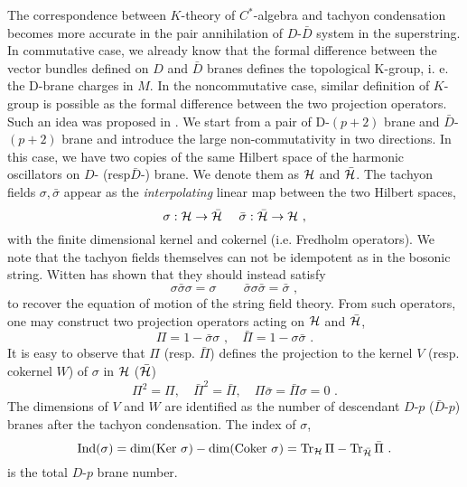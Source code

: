 \documentclass[a4paper,12pt]{article}
\begin{document}
The correspondence between $K$-theory of
$C^*$-algebra and tachyon condensation becomes more accurate
in the pair annihilation of $D$-$\bar{D}$ 
system in the superstring.
In commutative case, we already know
\cite{r:Witten2} that the formal difference between the 
vector bundles defined on $D$ and $\bar{D}$ branes defines
the topological K-group, i. e. the D-brane charges in $M$.
In the noncommutative case, similar definition of
$K$-group is possible as the formal difference
between the  two projection operators.
Such an idea was proposed in \cite{r:Witten}.
We start from  a pair of D-$(p+2)$ brane and
$\bar D$-$(p+2)$ brane and introduce the large
non-commutativity in two directions.
In this case, we have two copies of
the same Hilbert space of the harmonic oscillators 
on $D$- (resp$\bar D$-) brane. We denote them as ${\cal H}$ and $\bar{{\cal H}}$.
The tachyon fields $\sigma,\bar\sigma$ 
appear as the {\em interpolating} 
linear map between the two Hilbert spaces,
\begin{equation}
 \sigma : {\cal H} \rightarrow \bar{{\cal H}}\,\,\quad
 \bar\sigma : \bar{{\cal H}} \rightarrow {\cal H}\,\,,
\end{equation}
with the finite dimensional kernel and cokernel
(i.e. Fredholm operators).
We note that the tachyon fields themselves can not
be idempotent as in the bosonic string. Witten \cite{r:Witten}
has shown that they should instead satisfy
\begin{equation}
 \sigma \bar\sigma \sigma=\sigma\,\qquad
 \bar\sigma \sigma \bar\sigma = \bar\sigma\,\,,
\end{equation}
to recover the equation of motion of the 
string field theory.  
{}From such operators, one may construct two projection operators
acting on ${\cal H}$ and $\bar{{\cal H}}$,
\begin{equation}
 \Pi=1-\bar\sigma\sigma\,\,,\quad
 \bar\Pi=1-\sigma\bar\sigma\,\,.
\end{equation}
It is easy to observe that $\Pi$ (resp. $\bar\Pi$) defines 
the projection to the kernel $V$ (resp. cokernel $W$) of 
$\sigma$ in ${\cal H}$ ($\bar{{\cal H}}$)
\begin{equation}
 \Pi^2=\Pi,\quad
 \bar\Pi^2=\bar\Pi,\quad
 \Pi\bar\sigma = \bar\Pi\sigma =0\,\,.
\end{equation}
The dimensions of $V$ and
$W$ are identified as the number of 
descendant $D$-$p$ ($\bar D$-$p$)
branes after the tachyon condensation. The index of $\sigma$,
\begin{equation}\label{index}
\mbox{Ind}(\sigma)=\mbox{dim}(\mbox{Ker }\sigma)
-\mbox{dim}(\mbox{Coker }\sigma)=
\mbox{Tr}_{{\cal H}}\,\Pi -\mbox{Tr}_{\bar{{\cal H}}}\,\bar\Pi\,\,.
\end{equation}
is the total $D$-$p$ brane number.
\end{document}
